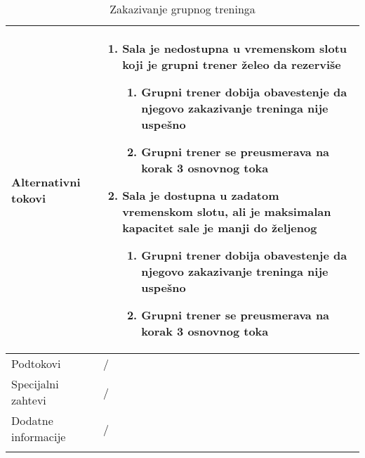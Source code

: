 \documentclass[../grupniTreninzi.tex]{subfiles}
\begin{document}
\begin{longtable}{| p{} | p{} |}
\hline
    Alternativni tokovi & 
       \begin{enumerate}
        \item Sala je nedostupna u vremenskom slotu koji je grupni trener želeo da rezerviše
            \begin{enumerate}
                \item Grupni trener dobija obavestenje da njegovo zakazivanje treninga nije uspešno
                \item Grupni trener se preusmerava na korak 3 osnovnog toka
            \end{enumerate}
        \item Sala je dostupna u zadatom vremenskom slotu, ali je maksimalan kapacitet sale je manji do željenog
            \begin{enumerate}
                \item Grupni trener dobija obavestenje da njegovo zakazivanje treninga nije uspešno
                \item Grupni trener se preusmerava na korak 3 osnovnog toka
            \end{enumerate}
    \end{enumerate}\\
\hline
    Podtokovi & /\\
\hline
    Specijalni zahtevi & /\\
\hline
    Dodatne informacije & /\\
\hline
\caption{Zakazivanje grupnog treninga} %
\end{longtable}
\end{document}
